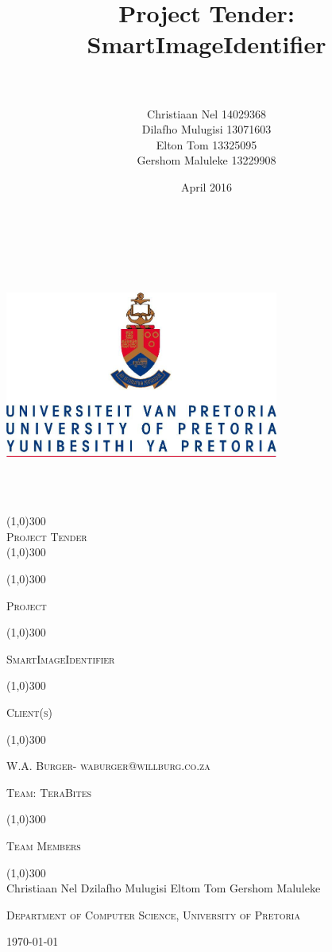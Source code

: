 \documentclass[12pt,a4paper]{report}
\title{Project Tender: \\ SmartImageIdentifier }
\author{\\\\Christiaan Nel 14029368\\ Dilafho Mulugisi 13071603 \\
	Elton Tom 13325095 \\ Gershom Maluleke 13229908
    }
\date{April 2016}
\begin{document}
\begin{titlepage}
	\begin{center}
		\vspace*{-3cm}\includegraphics[width=9cm,height=9cm,keepaspectratio]{UP.jpg}  \\
		[0.05cm]
		\line(1,0){300} \\
		[0.4cm]
		\textsc{\huge
			Project Tender
		} \\
		[0.1cm]
		\line(1,0){300} \\
		[0.05cm]

	\end{center}
	\centering
	\vspace{0.007cm}
	\line(1,0){300}
	\\[0.05cm]
    {\scshape\LARGE Project \par}
    \line(1,0){300}
	\\[0.2cm]
    {\scshape\large   SmartImageIdentifier  \par}
	\vspace{0.1cm}
	\line(1,0){300}
	\\[0.05cm]
	{\scshape\LARGE Client(s) \par}
	\line(1,0){300}
	\\[0.2cm]
	\vspace{0.01cm}
	
	{\scshape\large W.A. Burger- waburger@willburg.co.za\par}
	
	\vspace{0.5cm}
	{\scshape\LARGE Team: \large TeraBites\par}
	\line(1,0){300}
	\\[0.01cm]
	{\scshape\LARGE Team Members\par}
	\line(1,0){300}
	\\[0.01cm]
	\vspace{0.9cm}
	\vfill Christiaan Nel
	\vfill Dzilafho Mulugisi
	\vfill Eltom Tom
	\vfill Gershom Maluleke
	
	\vspace{0.9cm}
    {\scshape\large Department of Computer Science, University of Pretoria\par}


	

	{\large \today\par}
	\end{titlepage}
	
\end{document}
